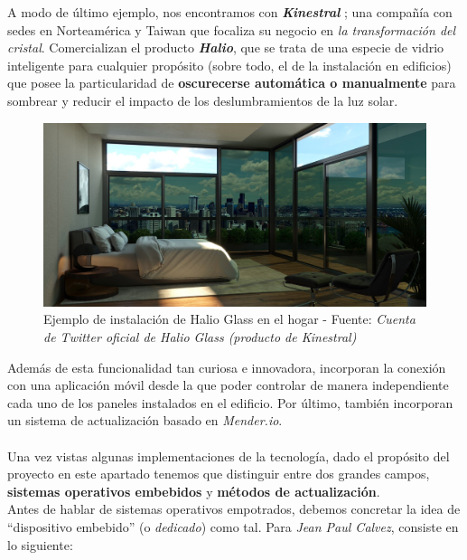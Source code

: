 A modo de último ejemplo, nos encontramos con \textbf{\textit{Kinestral}} \cite{kinestral}; una compañía con sedes en Norteamérica y Taiwan que focaliza su negocio en \textit{la transformación del cristal}. Comercializan el producto \textbf{\textit{Halio}}, que se trata de una especie de vidrio inteligente para cualquier propósito (sobre todo, el de la instalación en edificios) que posee la particularidad de \textbf{oscurecerse automática o manualmente} para sombrear y reducir el impacto de los deslumbramientos de la luz solar.

\begin{figure}[H]
	\centering
	\includegraphics[width=0.8\linewidth]{imagenes/halio-glass.jpeg}
	\caption{Ejemplo de instalación de Halio Glass en el hogar - Fuente: \textit{Cuenta de Twitter oficial de Halio Glass (producto de Kinestral)} \cite{halio-glass}}
	\label{halio-glass}
\end{figure}

Además de esta funcionalidad tan curiosa e innovadora, incorporan la conexión con una aplicación móvil desde la que poder controlar de manera independiente cada uno de los paneles instalados en el edificio. Por último, también incorporan un sistema de actualización basado en \textit{Mender.io}.\\

\noindent\makebox[\linewidth]{\rule{\textwidth}{0.4pt}}\\

Una vez vistas algunas implementaciones de la tecnología, dado el propósito del proyecto en este apartado tenemos que distinguir entre dos grandes campos, \textbf{sistemas operativos embebidos} y \textbf{métodos de actualización}.\\

Antes de hablar de sistemas operativos empotrados, debemos concretar la idea de ``dispositivo embebido'' (o \textit{dedicado}) como tal. Para \textit{Jean Paul Calvez}, consiste en lo siguiente:

